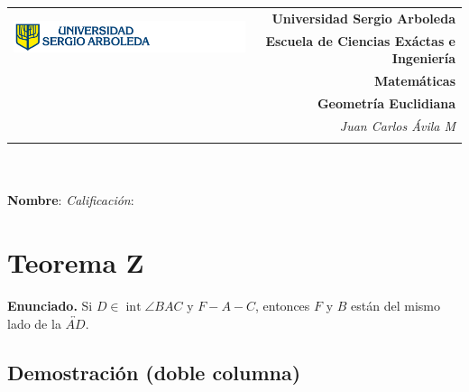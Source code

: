 \documentclass[12pt,letterpaper]{exam}
\newcommand{\base}[1]{\underline{\hspace{#1}}}
\newcommand{\uni}{Universidad Sergio Arboleda}
\newcommand{\fac}{\normalsize{Escuela de Ciencias Ex\'actas e Ingenier\'ia}}
\newcommand{\dep}{Matem\'aticas}
\newcommand{\mat}{Geometría Euclidiana}
\newcommand{\tema}{}
\newcommand{\autor}{Juan Carlos Ávila M}
\begin{document}
\begin{tabular}{lr}
    \multirow{2}{*}{\includegraphics[height=1.4cm]{logosergio.png}} &
    {\textbf{\uni}} \\
    & {\textbf{\fac}} \\
    & {\textbf{\dep}} \\
    & {\textbf{\mat \tema}} \\
    & {\textit{\autor}} \\
    & {\textit{}}
\end{tabular}\\
\base{19.5cm}\\
\textbf{Nombre}:  \quad 
\textit{Calificaci\'on}: \base{2cm} \\[6pt]


\section*{Teorema Z}
\textbf{Enunciado.} Si $D\in\operatorname{int}\angle BAC$ y $F-A-C$, entonces $F$ y $B$ están del mismo lado de la $\overleftrightarrow{AD}$.

\subsection*{Demostración (doble columna)}
\end{document}
